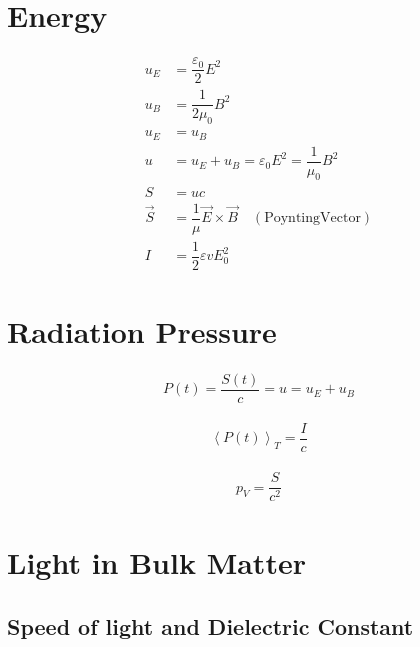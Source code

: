 \section{Energy}

\begin{equation*}
  \begin{aligned}
    u_{E} &= \dfrac{\varepsilon_{0}}{2} E^{2} \\
    u_{B} &= \dfrac{1}{2\mu_{0}} B^{2} \\
    u_{E} &= u_{B} \\
    u &= u_{E} + u_{B} = \varepsilon_{0} E^{2} = \dfrac{1}{\mu_{0}} B^{2} \\ 
    S &= uc \\
    \vec{S} &= \dfrac{1}{\mu} \vec{E} \times \vec{B} \quad \mathrm{(Poynting Vector)}\\
    I &= \dfrac{1}{2} \varepsilon v E_0^2
  \end{aligned}
\end{equation*}

\section{Radiation Pressure}

\begin{equation*}
  \begin{aligned}
    P(t) = \dfrac{S(t)}{c} = u = u_E + u_B
  \end{aligned}
\end{equation*}

\begin{equation*}
  \begin{aligned}
    \left< P(t) \right>_T = \dfrac{I}{c} 
  \end{aligned}
\end{equation*}

\begin{equation*}
  \begin{aligned}
    p_V = \dfrac{S}{c^{2}} 
  \end{aligned}
\end{equation*}

\section{Light in Bulk Matter}

\subsection{Speed of light and Dielectric Constant}


